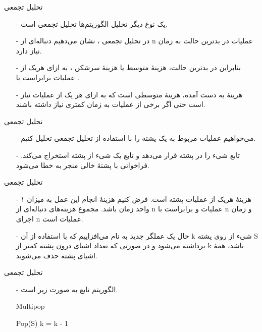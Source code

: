 \begin{frame}{‌تحلیل تجمعی}
\begin{itemize}\itemr
\item[-]
یک نوع دیگر تحلیل الگوریتم‌ها تحلیل تجمعی
 است.
\item[-]
در تحلیل تجمعی
، نشان می‌دهیم دنباله‌ای از n عملیات در بدترین حالت به زمان
نیاز دارد.
\item[-]
بنابراین در بدترین حالت، هزینهٔ متوسط یا هزینهٔ سرشکن
، به ازای هریک از عملیات برابراست با
 .
\item[-]
هزینهٔ به دست آمده، هزینهٔ متوسطی است که به ازای هر یک از عملیات نیاز است حتی اگر برخی از عملیات به زمان کمتری نیاز داشته باشند.
\end{itemize}
\end{frame}

\iffalse
\begin{frame}{‌تحلیل تجمعی}
\begin{itemize}\itemr
\item[-]
می‌خواهیم عملیات مربوط به یک پشته را با استفاده از تحلیل تجمعی تحلیل کنیم.
\item[-]
تابع
شیء 
 را در پشته 
  قرار می‌دهد و تابع
یک شیء از پشته استخراج می‌کند. فراخوانی
با پشتهٔ خالی منجر به خطا می‌شود.
\end{itemize}
\end{frame}


\begin{frame}{‌تحلیل تجمعی}
\begin{itemize}\itemr
\item[-]
هزینهٔ هریک از عملیات پشته
است. فرض کنیم هزینهٔ انجام این عمل به میزان ۱ واحد زمان باشد. مجموع هزینه‌های دنباله‌ای از n عملیات
و
برابراست با n و زمان اجرای n عملیات
است.
\item[-]
حال یک عملگر جدید به نام
می‌افزاییم که با استفاده از آن k شیء از روی پشته S برداشته می‌شود و در صورتی که تعداد اشیای درون پشته کمتر از k باشد، همهٔ اشیای پشته حذف می‌شوند.
\end{itemize}
\end{frame}


\begin{frame}{‌تحلیل تجمعی}
\begin{itemize}\itemr
\item[-]
الگوریتم تابع
به صورت زیر است.
\begin{algorithm}[H]\alglr
  \caption{Multipop} 
  \begin{algorithmic}[1]
        		\State Pop(S)
        		\State k = k - 1
         \EndWhile
  \end{algorithmic}
  \label{alg:merge}
\end{algorithm}
\end{itemize}
\end{frame}


